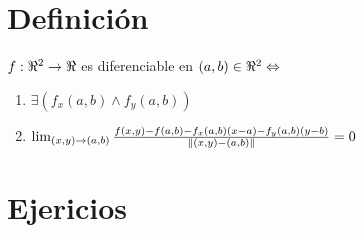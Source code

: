 \documentclass[../practica_04.tex]{subfiles}
\begin{document}
    \section*{Definición}

    $f:\real^2 \rightarrow \real$ es diferenciable en $(a,b) \in \real^2 \Leftrightarrow$

    \begin{enumerate}
        \item $\exists (f_x(a,b) \wedge f_y(a,b))$
        \item $\lim_{(x,y)\to(a,b)} \frac{f(x,y)-f(a,b)-f_x(a,b)(x-a)-f_y(a,b)(y-b)}{\norm*{(x,y)-(a,b)}} = 0 $
    \end{enumerate}

    \section*{Ejericios}
\end{document}
